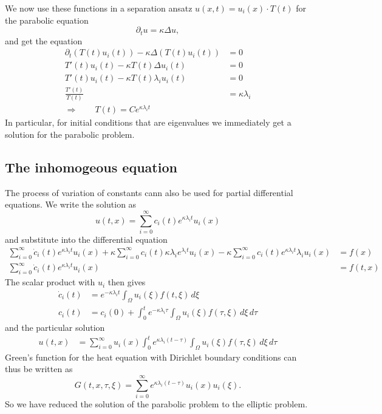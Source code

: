 We now use these functions in a separation ansatz
$u(x,t)=u_i(x)\cdot T(t)$ for the parabolic equation
\[
\partial_tu=\kappa\Delta u,
\]
and get the equation
\begin{align*}
\partial_t (T(t)u_i(t))-\kappa\Delta(T(t)u_i(t))&=0
\\
T'(t)u_i(t)-\kappa T(t)\Delta u_i(t)&=0
\\
T'(t)u_i(t)-\kappa T(t)\lambda_i u_i(t)&=0
\\
\frac{T'(t)}{T(t)}&=\kappa\lambda_i
\\
\Rightarrow\qquad T(t)=Ce^{\kappa\lambda_it}
\end{align*}
In particular, for initial conditions that are eigenvalues we
immediately get a solution for the parabolic problem.

\subsection{The inhomogeous equation}
The process of variation of constants cann also be used for partial
differential equations.
We write the solution as
\[
u(t,x)=\sum_{i=0}^\infty c_i(t) e^{\kappa\lambda_i t}u_i(x)
\]
and substitute into the differential equation
\begin{align*}
\sum_{i=0}^\infty \dot c_i(t)e^{\kappa\lambda_it}u_i(x)
+\kappa\sum_{i=0}^\infty c_i(t)\kappa\lambda_i e^{\lambda_it}u_i(x)
-\kappa\sum_{i=0}^\infty c_i(t)e^{\kappa\lambda_it}\lambda_iu_i(x)
&=f(x)
\\
\sum_{i=0}^\infty \dot c_i(t)e^{\kappa\lambda_it}u_i(x)
&=f(t,x)
\end{align*}
The scalar product with $u_i$ then gives
\begin{align*}
\dot c_i(t)&= e^{-\kappa\lambda_it}\int_{\Omega}u_i(\xi)f(t,\xi)\,d\xi
\\
c_i(t)&=c_i(0)+\int_0^te^{-\kappa\lambda_i\tau}\int_{\Omega}u_i(\xi)f(\tau,\xi)\,d\xi\,d\tau
\end{align*}
and the particular solution
\begin{align*}
u(t,x)&=
\sum_{i=0}^\infty
u_i(x)
\int_0^t
e^{\kappa\lambda_i(t-\tau)}\int_{\Omega}u_i(\xi)f(\tau,\xi)\,d\xi\,d\tau
\end{align*}
Green's function for the heat equation with Dirichlet boundary conditions
can thus be written as
\[
G(t,x,\tau,\xi)
=
\sum_{i=0}^\infty
e^{\kappa\lambda_i (t-\tau)}
u_i(x)
u_i(\xi).
\]
So we have reduced the solution of the parabolic problem to the
elliptic problem.

